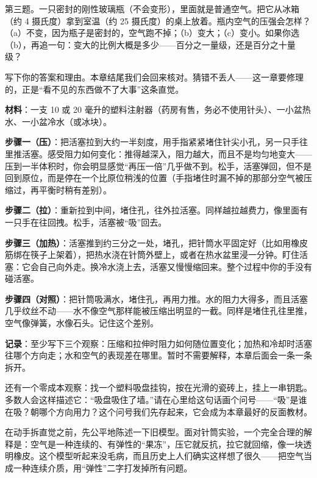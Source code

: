 第三题。一只密封的刚性玻璃瓶（不会变形），里面就是普通空气。把它从冰箱（约 4 摄氏度）拿到室温（约 25 摄氏度）的桌上放着。瓶内空气的压强会怎样？（a）不变，因为瓶子是密封的，空气跑不掉；（b）变大；（c）变小。如果你选（b），再追一句：变大的比例大概是多少——百分之一量级，还是百分之十量级？

写下你的答案和理由。本章结尾我们会回来核对。猜错不丢人——这一章要修理的，正是“看不见的东西做不了大事”这条直觉。


\begin{experiment}[针筒里的隐形弹簧]
\textbf{材料}：一支 10 或 20 毫升的塑料注射器（药房有售，务必不使用针头）、一小盆热水、一小盆冷水（或冰块）。

\textbf{步骤一（压）}：把活塞拉到大约一半刻度，用手指紧紧堵住针尖小孔，另一只手往里推活塞。感受阻力如何变化：推得越深入，阻力越大，而且不是均匀地变大——压到一半体积时，你会明显感觉“再压一倍”几乎做不到。松手，活塞弹回，但不是回到原位，而是停在一个比原位稍浅的位置（手指堵住时漏不掉的那部分空气被压缩过，再平衡时稍有差别）。

\textbf{步骤二（拉）}：重新拉到中间，堵住孔，往外拉活塞。同样越拉越费力，像里面有一只手在往回拽。松手，活塞被“吸”回去。

\textbf{步骤三（加热）}：活塞推到约三分之一处，堵孔，把针筒水平固定好（比如用橡皮筋绑在筷子上架着），把热水浇在针筒外壁上，或者在热水盆里浸一分钟。盯住活塞：它会自己向外走。换冷水浇上去，活塞又慢慢缩回来。整个过程中你的手没有碰活塞。

\textbf{步骤四（对照）}：把针筒吸满水，堵住孔，再用力推。水的阻力大得多，而且活塞几乎纹丝不动——水不像空气那样能被压缩出明显的一截。同样是堵住孔往里推，空气像弹簧，水像石头。记住这个差别。

\textbf{记录}：至少写下三个观察：压缩和拉伸时阻力如何随位置变化；加热和冷却时活塞往哪个方向走；水和空气的表现差在哪里。暂时不需要解释，本章后面会一条一条拆开。
\end{experiment}

还有一个零成本观察：找一个塑料吸盘挂钩，按在光滑的瓷砖上，挂上一串钥匙。多数人会这样描述它：“吸盘吸住了墙。”请在心里给这句话画个问号——“吸”是谁在吸？朝哪个方向用力？这个问号我们先存起来，它会成为本章最好的反面教材。


在动手拆直觉之前，先公平地陈述一下旧模型。面对针筒实验，一个完全合理的解释是：空气是一种连续的、有弹性的“果冻”，压它就反抗，拉它就回缩，像一块透明橡皮。这个模型听起来没毛病，而且历史上人们确实这样想了很久——把空气当成一种连续介质，用“弹性”二字打发掉所有问题。


